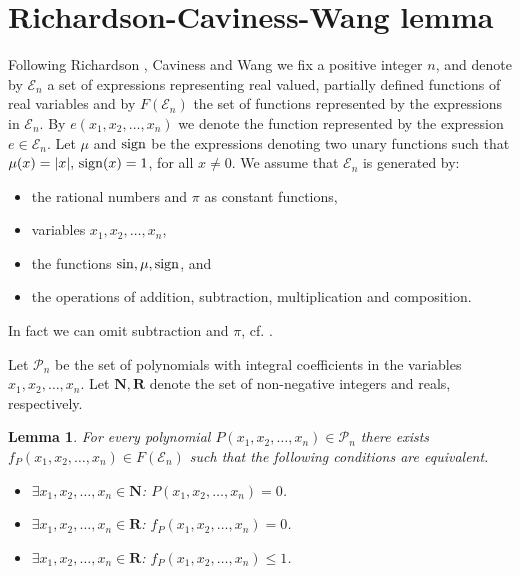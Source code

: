 \documentclass[
aip,
cha,
amssymb
]{revtex4-1}
\def \N{{\mathbf N}}
\def \R{{\mathbf R}}
\newtheorem{lem}[thm]{Lemma}
\begin{document}
\section{Richardson-Caviness-Wang lemma}
Following Richardson \cite{richardson68}, Caviness \cite{321591} and Wang \cite{wang} we fix a positive integer $n$,
and denote by $\mathcal{E}_{n}$ a set of expressions representing real valued, partially defined functions of real variables and by $F(\mathcal{E}_{n})$
the set of functions represented by the expressions in $\mathcal{E}_{n}$. By $e(x_{1}, x_{2}, \ldots ,x_{n})$ we denote the function  represented by
the expression  $e\in \mathcal{E}_{n}$. Let
$\mu$ and ${\rm sign}$ be the expressions denoting two unary functions such that
$\mu(x) = |x|,\,  {\rm sign}(x) = 1$, for all $x\not= 0$.
We assume that $\mathcal{E}_{n}$
is generated by:
\begin{itemize}
\item[{\rm (i)}]   the rational numbers and $\pi$ as constant functions,
\item[{\rm (ii)}]    variables $x_{1}, x_{2}, \ldots ,x_{n}$,
\item[{\rm (iii)}]     the functions $\sin, \mu, {\rm sign}$, and
\item[{\rm (iv)}]    the operations of  addition, subtraction, multiplication and composition.
\end{itemize}


In fact we can omit subtraction and $\pi$, cf. \cite{wang,Laczkovich-2002}.


Let $\mathcal{P}_{n}$ be the set of  polynomials with integral coefficients
in the variables $x_{1}, x_{2}, \ldots ,x_{n}$. Let $\N, \R$ denote the set of non-negative integers and reals, respectively.


\begin{lem}\label{equiv} {\rm \cite{richardson68,321591,wang} }
For every polynomial $P(x_{1}, x_{2}, \ldots ,x_{n}) \in \mathcal{P}_{n}$ there exists $f_{P}(x_{1}, x_{2}, \ldots ,x_{n}) \in F(\mathcal{E}_{n})$ such that the following conditions are equivalent.
\begin{itemize}
\item[{\rm (i)}] $\exists x_{1}, x_{2}, \ldots ,x_{n} \in \N$:
$P(x_{1}, x_{2}, \ldots ,x_{n})=0$.
\item[{\rm (ii)}]  $\exists  x_{1}, x_{2}, \ldots ,x_{n} \in \R$:
$f_{P}(x_{1}, x_{2}, \ldots ,x_{n})=0$.
\item[{\rm (iii)}]
$\exists  x_{1}, x_{2}, \ldots ,x_{n} \in \R$:
$f_{P}(x_{1}, x_{2}, \ldots ,x_{n})\le 1$.
\end{itemize}

\end{lem}
\end{document}
